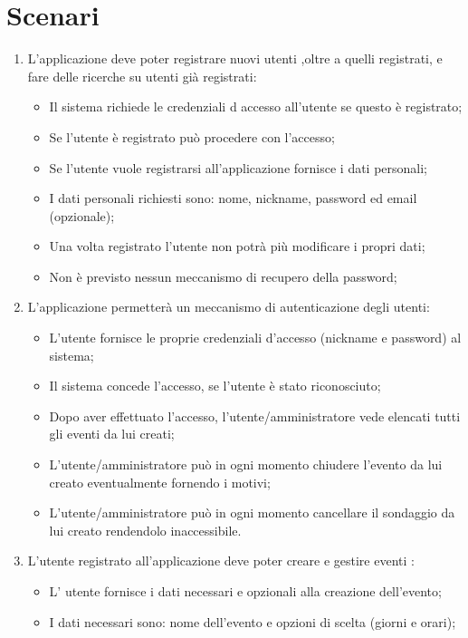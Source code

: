 \chapter{Scenari}

\begin{enumerate}
\item L'applicazione deve poter registrare nuovi utenti ,oltre a quelli registrati, e fare delle ricerche su utenti già registrati:
\begin{itemize}
\item Il sistema richiede le credenziali d accesso all'utente se questo è registrato;
\item Se l'utente è registrato può procedere con l'accesso;
\item Se l'utente vuole registrarsi all'applicazione fornisce i dati personali;
\item I dati personali richiesti sono: nome, nickname, password ed email (opzionale);
\item Una volta registrato l'utente non potrà più modificare i propri dati;
\item Non è previsto nessun meccanismo di recupero della password; 
\end{itemize}
\item L'applicazione permetterà un meccanismo di autenticazione degli utenti:
\begin{itemize}
\item L'utente fornisce le proprie credenziali d'accesso (nickname e password) al sistema;
\item Il sistema concede l'accesso, se l'utente è stato riconosciuto;
\item Dopo aver effettuato l'accesso, l'utente/amministratore vede elencati tutti gli eventi da lui creati;
\item L'utente/amministratore può in ogni momento chiudere l'evento da lui creato eventualmente fornendo i motivi;
\item L'utente/amministratore può in ogni momento cancellare il sondaggio da lui creato rendendolo inaccessibile.
\end{itemize}
\item L'utente registrato all'applicazione deve poter creare e gestire eventi :
\begin{itemize}
\item L' utente fornisce i dati necessari e opzionali alla creazione dell'evento;
\item I dati necessari sono: nome dell'evento e opzioni di scelta (giorni e orari);

\end{itemize}
\end{enumerate}
